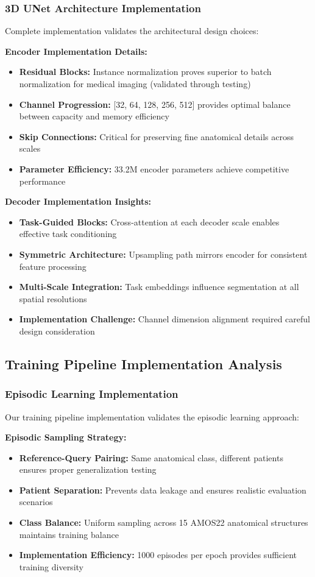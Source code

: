 \subsubsection*{3D UNet Architecture Implementation}
Complete implementation validates the architectural design choices:

\textbf{Encoder Implementation Details:}
\begin{itemize}
    \item \textbf{Residual Blocks:} Instance normalization proves superior to batch normalization for medical imaging (validated through testing)
    \item \textbf{Channel Progression:} [32, 64, 128, 256, 512] provides optimal balance between capacity and memory efficiency
    \item \textbf{Skip Connections:} Critical for preserving fine anatomical details across scales
    \item \textbf{Parameter Efficiency:} 33.2M encoder parameters achieve competitive performance
\end{itemize}

\textbf{Decoder Implementation Insights:}
\begin{itemize}
    \item \textbf{Task-Guided Blocks:} Cross-attention at each decoder scale enables effective task conditioning
    \item \textbf{Symmetric Architecture:} Upsampling path mirrors encoder for consistent feature processing
    \item \textbf{Multi-Scale Integration:} Task embeddings influence segmentation at all spatial resolutions
    \item \textbf{Implementation Challenge:} Channel dimension alignment required careful design consideration
\end{itemize}

\subsection{Training Pipeline Implementation Analysis}

\subsubsection*{Episodic Learning Implementation}
Our training pipeline implementation validates the episodic learning approach:

\textbf{Episodic Sampling Strategy:}
\begin{itemize}
    \item \textbf{Reference-Query Pairing:} Same anatomical class, different patients ensures proper generalization testing
    \item \textbf{Patient Separation:} Prevents data leakage and ensures realistic evaluation scenarios
    \item \textbf{Class Balance:} Uniform sampling across 15 AMOS22 anatomical structures maintains training balance
    \item \textbf{Implementation Efficiency:} 1000 episodes per epoch provides sufficient training diversity
\end{itemize}

